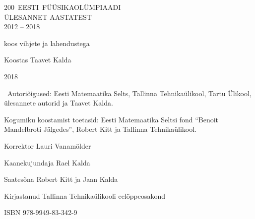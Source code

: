 \documentclass[11pt, twoside]{article}
\begin{document}
\begin{titlepage}
	\centering
	\vspace{10cm}
	{\sffamily\Huge \mbox{200 EESTI FÜÜSIKAOLÜMPIAADI}\\ ÜLESANNET AASTATEST\\ 2012 -- 2018\par}
	\vspace{1cm}
	{\Large koos vihjete ja lahendustega\par}
	\vfill
	{\Large Koostas Taavet Kalda}

	\vfill

	{\large 2018}
\end{titlepage}

\raggedbottom %
\mbox{}\vfill

\textcopyright~Autoriõigused: Eesti Matemaatika Selts, Tallinna Tehnikaülikool,
Tartu Ülikool, ülesannete autorid ja Taavet Kalda.
\vspace{0.5\baselineskip}

Kogumiku koostamist toetasid: Eesti Matemaatika Seltsi fond ``Benoit Mandelbroti Jälgedes'', Robert Kitt ja Tallinna Tehnikaülikool.
\vspace{0.5\baselineskip}


Korrektor Lauri Vanamölder

Kaanekujundaja Rael Kalda

Saatesõna Robert Kitt ja Jaan Kalda
\vspace{0.5\baselineskip}

Kirjastanud Tallinna Tehnikaülikooli eelõppeosakond
\vspace{0.5\baselineskip}

ISBN 978-9949-83-342-9
\newpage
\end{document}

